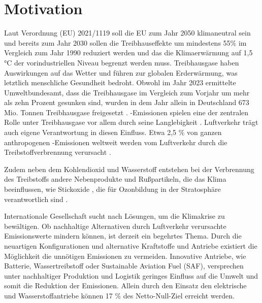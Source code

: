 \chapter{Motivation}
\label{ch:Einleitung}

Laut Verordnung (EU) 2021/1119 soll die EU zum Jahr 2050 klimaneutral sein und bereits zum Jahr 2030 sollen die Treibhauseffekte um mindestens 55\%
im Vergleich zum Jahr 1990 reduziert werden und das die Klimaerwärmung auf 1,5 °C der vorindustriellen Niveau begrenzt werden muss.
Treibhausgase haben Auswirkungen auf das Wetter und führen zur globalen Erderwärmung, was letztlich menschliche Gesundheit bedroht. 
Obwohl im Jahr 2023 ermittelte Umweltbundesamt, dass die Treibhausgase im Vergleich zum Vorjahr um mehr als zehn Prozent gesunken sind, 
wurden in dem Jahr allein in Deutschland 673 Mio. Tonnen Treibhausgase freigesetzt \cite{bundesregierung}.
-Emissionen spielen eine der zentralen Rolle unter Treibhausgase vor allem durch seine Langlebigkeit \cite{filonchyk2024greenhouse}. 
Luftverkehr trägt auch eigene Verantwortung in diesen Einfluss. 
Etwa 2,5 \% von ganzen anthropogenen -Emissionen weltweit werden vom Luftverkehr
durch die Treibstoffverbrennung verursacht \cite{conrady2019luftverkehr}. 

Zudem neben dem Kohlendioxid  und Wasserstoff  entstehen bei der Verbrennung des Treibstoffs andere Nebenprodukte und Rußpartikeln, die 
das Klima beeinflussen, wie Stickoxide , die für Ozonbildung in der Stratosphäre verantwortlich sind \cite{conrady2019luftverkehr}.

Internationale Gesellschaft sucht nach Lösungen, um die Klimakrise zu bewältigen. 
Ob nachhaltige Alternativen durch Luftverkehr verursachte Emissionswerte mindern können, ist derzeit ein begehrtes Thema.
Durch die neuartigen Konfigurationen und alternative Kraftstoffe und Antriebe existiert die Möglichkeit die unnötigen Emissionen zu vermeiden.
Innovative Antriebe, wie Batterie, Wassertreibstoff oder Sustainable Aviation Fuel (SAF), versprechen unter nachhaltiger Produktion und
Logistik geringes Einfluss auf die Umwelt und somit die Reduktion der Emissionen.
Allein durch den Einsatz den elektrische und Wasserstoffantriebe können 17 \% des Netto-Null-Ziel erreicht werden. %
%

